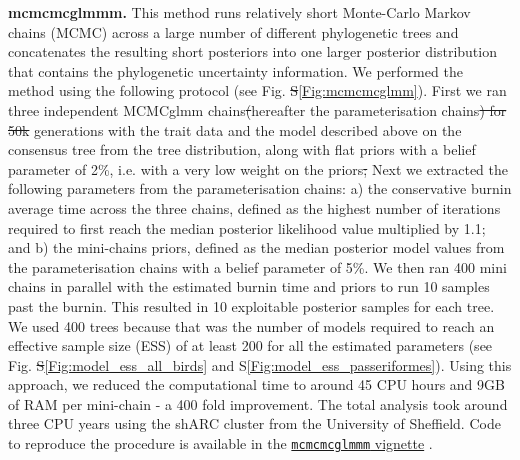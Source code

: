 \documentclass[12pt,letterpaper]{article}
\providecommand{\DIFaddtex}[1]{{\protect\color{blue}\uwave{#1}}} %
\providecommand{\DIFdeltex}[1]{{\protect\color{red}\sout{#1}}}                      %
\providecommand{\DIFaddbegin}{} %
\providecommand{\DIFaddend}{} %
\providecommand{\DIFdelbegin}{} %
\providecommand{\DIFdelend}{} %
\providecommand{\DIFadd}[1]{\texorpdfstring{\DIFaddtex{#1}}{#1}} %
\providecommand{\DIFdel}[1]{\texorpdfstring{\DIFdeltex{#1}}{}} %
\newcommand{\DIFscaledelfig}{0.5}
\newlength{\DIFdelgraphicswidth} %
\newlength{\DIFdelgraphicsheight} %
\newcommand{\DIFaddincludegraphics}[2][]{{\color{blue}\fbox{\DIFOincludegraphics[#1]{#2}}}} %
\newcommand{\DIFdelincludegraphics}[2][]{%
\sbox{\DIFdelgraphicsbox}{\DIFOincludegraphics[#1]{#2}}%
\settoboxwidth{\DIFdelgraphicswidth}{\DIFdelgraphicsbox} %
\settoboxtotalheight{\DIFdelgraphicsheight}{\DIFdelgraphicsbox} %
\scalebox{\DIFscaledelfig}{%
\parbox[b]{\DIFdelgraphicswidth}{\usebox{\DIFdelgraphicsbox}\\[-\baselineskip] \rule{\DIFdelgraphicswidth}{0em}}\llap{\resizebox{\DIFdelgraphicswidth}{\DIFdelgraphicsheight}{%
\setlength{\unitlength}{\DIFdelgraphicswidth}%
\begin{picture}(1,1)%
\thicklines\linethickness{2pt} %
{\color[rgb]{1,0,0}\put(0,0){\framebox(1,1){}}}%
{\color[rgb]{1,0,0}\put(0,0){\line( 1,1){1}}}%
{\color[rgb]{1,0,0}\put(0,1){\line(1,-1){1}}}%
\end{picture}%
}\hspace*{3pt}}} %
} %
\DeclareRobustCommand{\DIFaddbegin}{\DIFOaddbegin \let\includegraphics\DIFaddincludegraphics} %
\DeclareRobustCommand{\DIFaddend}{\DIFOaddend \let\includegraphics\DIFOincludegraphics} %
\DeclareRobustCommand{\DIFdelbegin}{\DIFOdelbegin \let\includegraphics\DIFdelincludegraphics} %
\DeclareRobustCommand{\DIFdelend}{\DIFOaddend \let\includegraphics\DIFOincludegraphics} %
\begin{document}
\textbf{mcmcmcglmmm.} This method runs relatively short Monte-Carlo Markov chains (MCMC) across a large number of different phylogenetic trees and concatenates the resulting short posteriors into one larger posterior distribution that contains the phylogenetic uncertainty information.
We performed the method using the following protocol (see Fig. \DIFdelbegin \DIFdel{S}\DIFdelend \ref{Fig:mcmcmcglmm}).
First we ran three independent MCMCglmm chains\DIFdelbegin \DIFdel{(}\DIFdelend \DIFaddbegin \DIFadd{, }\DIFaddend hereafter the parameterisation chains\DIFdelbegin \DIFdel{) for 50k }\DIFdelend \DIFaddbegin \DIFadd{, for 50,000 }\DIFaddend generations with the trait data and the model described above on the consensus tree from the tree distribution, along with flat priors with a belief parameter of 2\%, i.e. with a very low weight on the priors\DIFdelbegin \DIFdel{;
}\DIFdelend \DIFaddbegin \DIFadd{.
}\DIFaddend Next we extracted the following parameters from the parameterisation chains: a) the conservative burnin average time across the three chains, defined as the highest number of iterations required to first reach the median posterior likelihood value multiplied by 1.1; and b) the mini-chains priors, defined as the median posterior model values from the parameterisation chains with a belief parameter of 5\%.
We then ran 400 mini chains in parallel with the estimated burnin time and priors to run 10 samples past the burnin.
This resulted in 10 exploitable posterior samples for each tree.
We used 400 trees because that was the number of models required to reach an effective sample size (ESS) of at least 200 for all the estimated parameters (see Fig. \DIFdelbegin \DIFdel{S}\DIFdelend \ref{Fig:model_ess_all_birds} and S\ref{Fig:model_ess_passeriformes}).
Using this approach, we reduced the computational time to around 45 CPU hours and 9GB of RAM per mini-chain - a 400 fold improvement.
The total analysis took around three CPU years using the shARC cluster from the University of Sheffield.
Code to reproduce the procedure is available in the \href{https://raw.rawgit.net/TGuillerme/mcmcmcglmmm/main/inst/MCMCglmm_mini_chains.html}{\texttt{mcmcmcglmmm} vignette} \cite{mcmcmcglmmm}.
\end{document}
